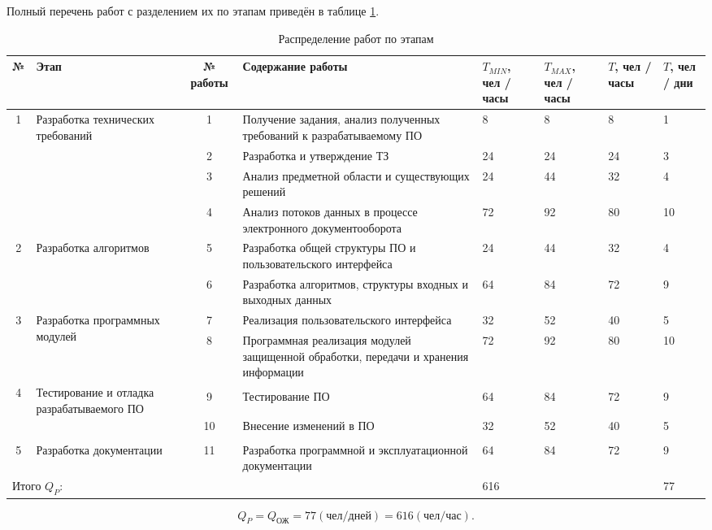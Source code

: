 \vspace{\baselineskip}
Полный перечень работ с разделением их по этапам приведён в таблице \ref{table:works}.
\begin{table} [h!]
  \centering
  \parbox{15cm}{\caption{Распределение работ по этапам}\label{table:works}}
 \begin{center}
  \begin{tabular}{| c | m{2.5cm} | c | m{5cm} | m{1cm} | m{1cm} | m{1cm} | m{1cm} |}
  \hline
 \rowcolor{Gray} №  &\centering Этап &\centering № работы &\centering  Содержание работы &\centering $T_{MIN}$, чел / часы &\centering $T_{MAX}$, чел / часы &\centering $T$, чел / часы &\centering $T$, чел / дни \tabularnewline \hline

\multirow{4}{*}{1} 	& \multirow{4}{3cm}{Разработка технических требований}	& 1 & Получение задания, анализ полученных требований к разрабатываемому ПО		& 8 & 8	& 8	& 1 \\ \cline{3-8}
 	& & 2 & Разработка и утверждение ТЗ 	& 24 & 24 & 24 & 3 \\ \cline{3-8}
 	& & 3 & Анализ предметной области и существующих решений & 24 & 44 & 32  & 4 \\ \cline{3-8}
 	& & 4 & Анализ потоков данных в процессе электронного документооборота & 72 & 92 & 80 & 10 \\ \hline

\multirow{2}{*}{2} & \multirow{2}{3cm}{Разработка алгоритмов} & 5 & Разработка общей структуры ПО и пользовательского интерфейса & 24 & 44 & 32 & 4 \\ \cline{3-8}
	& & 6 & Разработка алгоритмов, структуры входных и выходных данных & 64 & 84 & 72 & 9 \\ \hline

\multirow{2}{*}{3} & \multirow{2}{3cm}{Разработка программных модулей} & 7 & Реализация пользовательского интерфейса & 32 & 52 & 40 & 5 \\ \cline{3-8}
	& & 8 & Программная реализация модулей защищенной обработки, передачи и хранения информации & 72 & 92 & 80 & 10 \\ \hline

\multirow{6}{*}{4} & \multirow{6}{2.5cm}{Тестирование и отладка разрабатываемого ПО} & & & & & & \\
  & & 9 & Тестирование ПО & 64 & 84 & 72 & 9 \\
  & & & & & & & \\ \cline{3-8}
	& & & & & & & \\
	& & 10 & Внесение изменений в ПО & 32 & 52 & 40 & 5 \\
	& & & & & & & \\ \hline

5 & Разработка документации & 11 & Разработка программной и эксплуатационной документации & 64 & 84 & 72 & 9 \\ \hline

\multicolumn{4}{|l|}{Итого $Q_P$:} & \multicolumn{3}{|l|}{616} & 77 \\ \hline
   \end{tabular}
 \end{center}
\end{table}

 $$
Q_P = Q_{\textrm{ОЖ}} = 77 (\textrm{чел/дней}) = 616 (\textrm{чел/час}).
 $$

